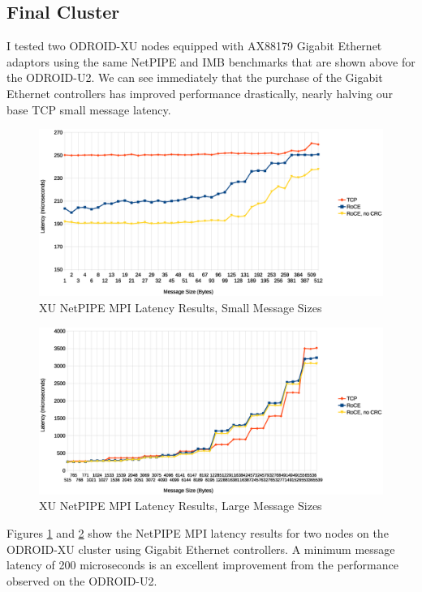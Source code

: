 \documentclass[11pt]{book}
\begin{document}
\subsection{Final Cluster}\label{final-cluster-benchmarks}

I tested two ODROID-XU nodes equipped with AX88179 Gigabit Ethernet adaptors using the
same NetPIPE and IMB benchmarks that are shown above for the ODROID-U2.  We can see
immediately that the purchase of the Gigabit Ethernet controllers has improved performance
drastically, nearly halving our base TCP small message latency.

\begin{figure}
\includegraphics[width=\textwidth]{xu_lat_small}
\caption{XU NetPIPE MPI Latency Results, Small Message Sizes}
\label{xu-lat-small}
\end{figure}

\begin{figure}
\includegraphics[width=\textwidth]{xu_lat_large}
\caption{XU NetPIPE MPI Latency Results, Large Message Sizes}
\label{xu-lat-large}
\end{figure}

Figures \ref{xu-lat-small} and \ref{xu-lat-large} show the NetPIPE MPI latency results for
two nodes on the ODROID-XU cluster using Gigabit Ethernet controllers.  A minimum message
latency of 200 microseconds is an excellent improvement from the performance observed on
the ODROID-U2.
\end{document}
